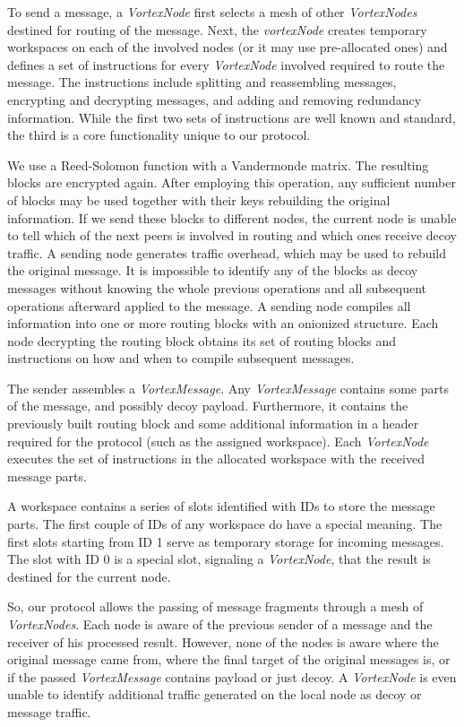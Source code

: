 \documentclass[acmsmall, screen, review]{acmart}
\begin{document}
To send a message, a \emph{VortexNode} first selects a mesh of other \emph{VortexNodes} destined for routing of the message. Next, the \emph{vortexNode} creates temporary workspaces on each of the involved nodes (or it may use pre-allocated ones) and defines a set of instructions for every \emph{VortexNode} involved required to route the message. The instructions include splitting and reassembling messages, encrypting and decrypting messages, and adding and removing redundancy information. While the first two sets of instructions are well known and standard, the third is a core functionality unique to our protocol. 

We use a Reed-Solomon function with a Vandermonde matrix. The resulting blocks are encrypted again. After employing this operation, any sufficient number of blocks may be used together with their keys rebuilding the original information. If we send these blocks to different nodes, the current node is unable to tell which of the next peers is involved in routing and which ones receive decoy traffic. A sending node generates traffic overhead, which may be used to rebuild the original message. It is impossible to identify any of the blocks as decoy messages without knowing the whole previous operations and all subsequent operations afterward applied to the message. A sending node compiles all information into one or more routing blocks with an onionized structure. Each node decrypting the routing block obtains its set of routing blocks and instructions on how and when to compile subsequent messages. 

The sender assembles a \emph{VortexMessage}. Any \emph{VortexMessage} contains some parts of the message, and possibly decoy payload. Furthermore, it contains the previously built routing block and some additional information in a header required for the protocol (such as the assigned workspace). Each \emph{VortexNode} executes the set of instructions in the allocated workspace with the received message parts. 

A workspace contains a series of slots identified with IDs to store the message parts. The first couple of IDs of any workspace do have a special meaning. The first slots starting from ID 1 serve as temporary storage for incoming messages. The slot with ID 0 is a special slot, signaling a \emph{VortexNode}, that the result is destined for the current node.

So, our protocol allows the passing of message fragments through a mesh of \emph{VortexNodes}. Each node is aware of the previous sender of a message and the receiver of his processed result. However, none of the nodes is aware where the original message came from, where the final target of the original messages is, or if the passed \emph{VortexMessage} contains payload or just decoy. A \emph{VortexNode} is even unable to identify additional traffic generated on the local node as decoy or message traffic.
\end{document}
